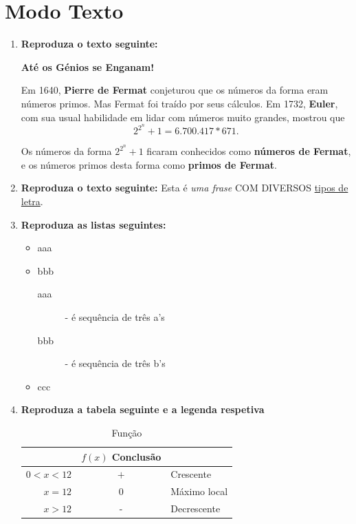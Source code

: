 \documentclass[13pt]{article}
\begin{document}
\section*{\huge{Modo Texto}} 
\normalsize
\begin{enumerate}
\item \textbf{Reproduza o texto seguinte:} 
\begin{center} 
\textbf{Até os Génios se Enganam!} 
\end{center}

Em 1640, \textbf{Pierre de Fermat} conjeturou que os números da forma eram números primos. Mas Fermat foi traído por seus cálculos. Em 1732, \textbf{Euler}, com sua usual habilidade em lidar com números muito grandes, mostrou que  $$2^{2^n} + 1 = 6.700.417*671.$$

Os números da forma $2^{2^n}+1$ ficaram conhecidos como \textbf{números de Fermat}, e os números primos desta forma como \textbf{primos de Fermat}. \\

\item \textbf{Reproduza o texto seguinte:}
Esta é \emph{uma frase} \scriptsize{COM DIVERSOS} \normalsize{\underline{tipos de letra}}.

\item \textbf{Reproduza as listas seguintes:}
\begin{itemize}
\item aaa
\item bbb
\begin{description}
\item[aaa] - é sequência de três a's
\item[bbb] - é sequência de três b's
\end{description}
\item ccc
\end{itemize}

\item \textbf{Reproduza a tabela seguinte e a legenda respetiva}

\begin{table}[h!]
\caption{Função}
\centering
\begin{tabular}{r | c | l} \hline
& $f(x)$ Conclusão & \\ \hline
$0<x<12$ & $+$ & Crescente \\
$x=12$ & $0$ & Máximo local \\ 
$x>12$ & - & Decrescente \\ \hline
\end{tabular}
\end{table}


\end{enumerate}
\end{document}
